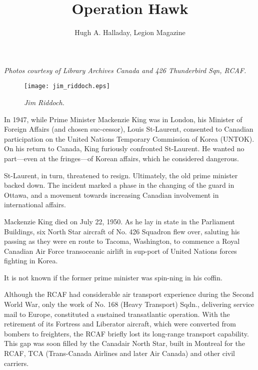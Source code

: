 %


\title{Operation Hawk}
\author{Hugh A. Halladay, Legion Magazine}

\textit{Photos courtesy of Library Archives Canada and 426 Thunderbird
  Sqn, RCAF.}

\maketitle

\begin{figure}[htbp]
   \vspace{2em}
   \centering
   \texttt{[image: jim\_riddoch.eps]}
   \caption*{\small \em Jim Riddoch.}
   \label{fig:jim_riddoch.eps}
\end{figure}

In 1947, while Prime Minister Mackenzie King was in London, his
Minister of Foreign Affairs (and chosen suc-cessor), Louis St-Laurent,
consented to Canadian participation on the United Nations Temporary
Commission of Korea (UNTOK). On his return to Canada, King furiously
confronted St-Laurent. He wanted no part---even at the fringes—of
Korean affairs, which he considered dangerous.

St-Laurent, in turn, threatened to resign. Ultimately, the old prime
minister backed down. The incident marked a phase in the changing of
the guard in Ottawa, and a movement towards increasing Canadian
involvement in international affairs.

Mackenzie King died on July 22, 1950. As he lay in state in the
Parliament Buildings, six North Star aircraft of No. 426 Squadron flew
over, saluting his passing as they were en route to Tacoma,
Washington, to commence a Royal Canadian Air Force transoceanic
airlift in sup-port of United Nations forces fighting in Korea.

It is not known if the former prime minister was spin-ning in his
coffin.

Although the RCAF had considerable air transport experience during
the Second World War, only the work of No. 168 (Heavy Transport)
Sqdn., delivering service mail to Europe, constituted a sustained
transatlantic operation. With the retirement of its Fortress and
Liberator aircraft, which were converted from bombers to freighters,
the RCAF briefly lost its long-range transport capability. This gap
was soon filled by the Canadair North Star, built in Montreal for the
RCAF, TCA (Trans-Canada Airlines and later Air Canada) and other civil
carriers.

